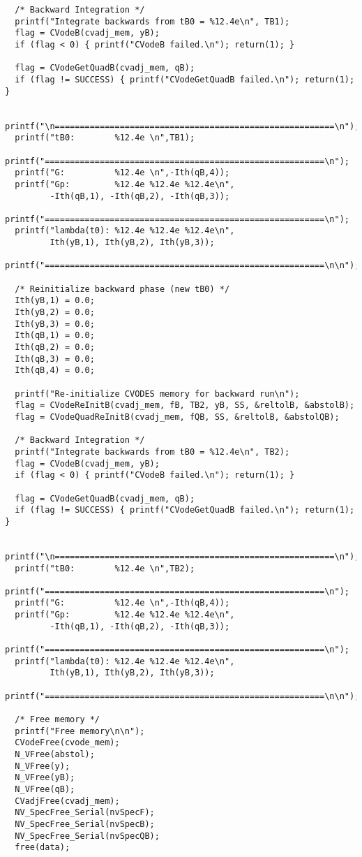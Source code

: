 \begin{verbatim}
  /* Backward Integration */
  printf("Integrate backwards from tB0 = %12.4e\n", TB1);
  flag = CVodeB(cvadj_mem, yB);
  if (flag < 0) { printf("CVodeB failed.\n"); return(1); }

  flag = CVodeGetQuadB(cvadj_mem, qB);
  if (flag != SUCCESS) { printf("CVodeGetQuadB failed.\n"); return(1); }

  printf("\n========================================================\n");
  printf("tB0:        %12.4e \n",TB1);
  printf("========================================================\n");
  printf("G:          %12.4e \n",-Ith(qB,4));
  printf("Gp:         %12.4e %12.4e %12.4e\n", 
         -Ith(qB,1), -Ith(qB,2), -Ith(qB,3));
  printf("========================================================\n");
  printf("lambda(t0): %12.4e %12.4e %12.4e\n", 
         Ith(yB,1), Ith(yB,2), Ith(yB,3));
  printf("========================================================\n\n");

  /* Reinitialize backward phase (new tB0) */
  Ith(yB,1) = 0.0;
  Ith(yB,2) = 0.0;
  Ith(yB,3) = 0.0;
  Ith(qB,1) = 0.0;
  Ith(qB,2) = 0.0;
  Ith(qB,3) = 0.0;
  Ith(qB,4) = 0.0;

  printf("Re-initialize CVODES memory for backward run\n");
  flag = CVodeReInitB(cvadj_mem, fB, TB2, yB, SS, &reltolB, &abstolB);
  flag = CVodeQuadReInitB(cvadj_mem, fQB, SS, &reltolB, &abstolQB); 

  /* Backward Integration */
  printf("Integrate backwards from tB0 = %12.4e\n", TB2);
  flag = CVodeB(cvadj_mem, yB);
  if (flag < 0) { printf("CVodeB failed.\n"); return(1); }

  flag = CVodeGetQuadB(cvadj_mem, qB);
  if (flag != SUCCESS) { printf("CVodeGetQuadB failed.\n"); return(1); }

  printf("\n========================================================\n");
  printf("tB0:        %12.4e \n",TB2);
  printf("========================================================\n");
  printf("G:          %12.4e \n",-Ith(qB,4));
  printf("Gp:         %12.4e %12.4e %12.4e\n", 
         -Ith(qB,1), -Ith(qB,2), -Ith(qB,3));
  printf("========================================================\n");
  printf("lambda(t0): %12.4e %12.4e %12.4e\n", 
         Ith(yB,1), Ith(yB,2), Ith(yB,3));
  printf("========================================================\n\n");

  /* Free memory */
  printf("Free memory\n\n");
  CVodeFree(cvode_mem);
  N_VFree(abstol);
  N_VFree(y);
  N_VFree(yB);
  N_VFree(qB);
  CVadjFree(cvadj_mem);
  NV_SpecFree_Serial(nvSpecF);
  NV_SpecFree_Serial(nvSpecB);
  NV_SpecFree_Serial(nvSpecQB);
  free(data);


\end{verbatim}
